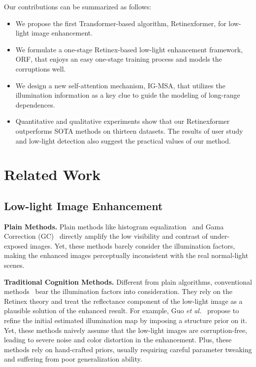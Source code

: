 \documentclass[10pt,twocolumn,letterpaper]{article}
\begin{document}
Our contributions can be summarized as follows:
\begin{itemize}
	\vspace{-1mm}
	\item We propose the first Transformer-based algorithm, Retinexformer, for  low-light image enhancement. 
	\vspace{-1mm}
	\item We formulate a one-stage Retinex-based low-light enhancement framework, ORF, that enjoys an easy one-stage training process and models the corruptions well.
	\vspace{-5mm}
	\item We design a new self-attention mechanism, IG-MSA, that utilizes the illumination information as a key clue to guide the modeling of long-range dependences.
	\vspace{-1mm}
	\item Quantitative and qualitative experiments show that our Retinexformer outperforms SOTA methods on thirteen datasets. The results of user study and low-light detection also suggest the practical values of our method.
\end{itemize}


\vspace{-2mm}
\section{Related Work}	
\vspace{-1mm}

\subsection{Low-light Image Enhancement}
\vspace{-1mm}



\noindent\textbf{Plain Methods.} Plain methods like histogram equalization~\cite{he_1,he_5,he_2,he_3,he} and Gama Correction (GC)~\cite{gc_1,gc_3,gc_2} directly amplify the low visibility and contrast of under-exposed images. Yet, these methods barely consider the illumination factors, making the enhanced images perceptually inconsistent with the real normal-light scenes.

\vspace{0.5mm}
\noindent\textbf{Traditional Cognition Methods.} Different from plain algorithms, conventional  methods~\cite{retinex_1,retinex_4,retinex_3,retinex_5,retinex_6} bear the illumination factors into consideration. They rely on the Retinex theory and treat the reflectance component of the low-light image as a plausible solution of the enhanced result. For example, Guo \emph{et al.}~\cite{lime} propose to refine the initial estimated illumination map by imposing a structure prior on it. Yet, these methods naively assume that the low-light images are corruption-free, leading to severe noise and color distortion in the enhancement. Plus, these methods rely on hand-crafted priors, usually requiring careful parameter tweaking and suffering from poor generalization ability.
\end{document}
